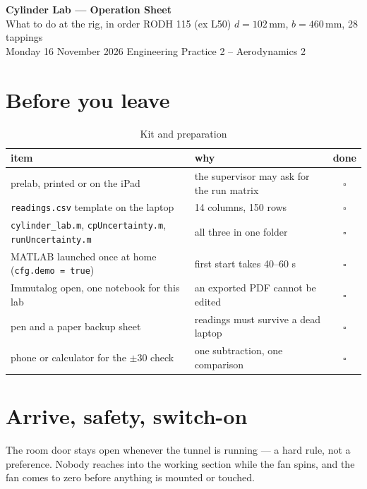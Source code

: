 \documentclass[11pt,a4paper]{article}
\begin{document}
\begin{center}
{\LARGE\bfseries Cylinder Lab --- Operation Sheet}\\[3pt]
{\small What to do at the rig, in order \quad\textbar\quad RODH 115 (ex L50)
\quad\textbar\quad $d = 102$\,mm, $b = 460$\,mm, 28 tappings}\\[3pt]
{\footnotesize Monday 16 November 2026 \quad\textbar\quad Engineering Practice 2 -- Aerodynamics 2}
\end{center}

\vspace{2pt}

\section{Before you leave}

\begin{table}[H]
\centering
\caption{Kit and preparation}
\small
\begin{tabularx}{\textwidth}{@{}p{5.6cm} X c@{}}
\toprule
item & why & done \\
\midrule
prelab, printed or on the iPad & the supervisor may ask for the run matrix & $\square$ \\
\texttt{readings.csv} template on the laptop & 14 columns, 150 rows & $\square$ \\
\texttt{cylinder\_lab.m}, \texttt{cpUncertainty.m}, \texttt{runUncertainty.m} & all three in one folder &
$\square$ \\
MATLAB launched once at home (\texttt{cfg.demo = true}) & first start takes 40--60 s & $\square$ \\
Immutalog open, one notebook for this lab & an exported PDF cannot be edited & $\square$ \\
pen and a paper backup sheet & readings must survive a dead laptop & $\square$ \\
phone or calculator for the $\pm30$ check & one subtraction, one comparison & $\square$ \\
\bottomrule
\end{tabularx}
\end{table}

\section{Arrive, safety, switch-on}

The room door stays open whenever the tunnel is running --- a hard rule, not a preference. Nobody
reaches into the working section while the fan spins, and the fan comes to zero before anything is
mounted or touched.
\end{document}
